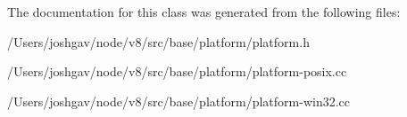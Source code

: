 The documentation for this class was generated from the following files\+:\begin{DoxyCompactItemize}
\item 
/\+Users/joshgav/node/v8/src/base/platform/platform.\+h\item 
/\+Users/joshgav/node/v8/src/base/platform/platform-\/posix.\+cc\item 
/\+Users/joshgav/node/v8/src/base/platform/platform-\/win32.\+cc\end{DoxyCompactItemize}
